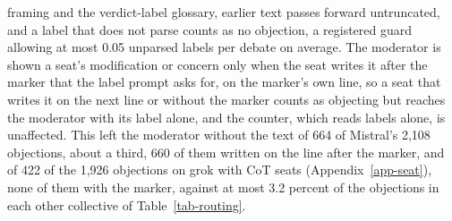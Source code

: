 framing and the verdict-label glossary, earlier text passes forward
untruncated, and a label that does not parse counts as no objection, a
registered guard allowing at most 0.05 unparsed labels per debate on average.
The moderator is shown a seat's modification or concern only when the seat
writes it after the marker that the label prompt asks for, on the marker's
own line, so a seat that writes it on the next line or without the marker
counts as objecting but reaches the moderator with its label alone, and the
counter, which reads labels alone, is unaffected. This left the moderator
without the text of 664 of Mistral's 2,108 objections, about a third, 660 of
them written on the line after the marker, and of 422 of the 1,926
objections on grok with CoT seats (Appendix~\ref{app-seat}), none of them
with the marker, against at most 3.2 percent of the objections in each other
collective of Table~\ref{tab-routing}.
